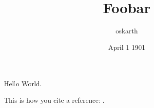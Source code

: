 \documentclass[12pt]{article}
\title{Foobar}
\author{oskarth}
\date{April 1 1901}
\begin{document}
\maketitle

Hello World.

This is how you cite a reference: \cite{goossens93}.


\end{document}
